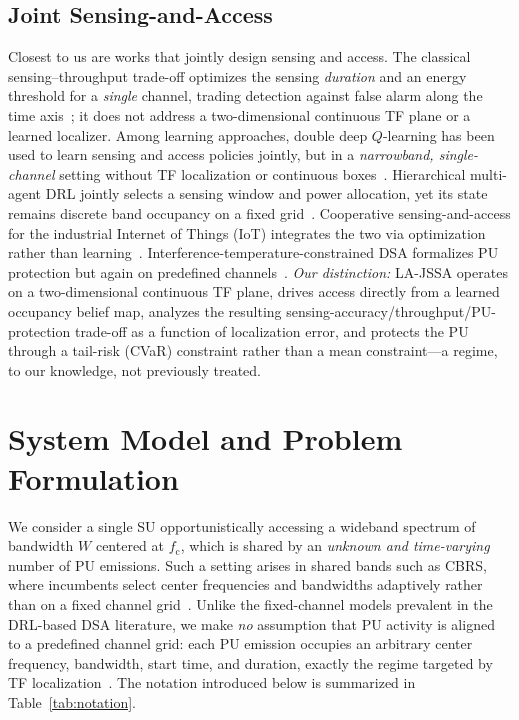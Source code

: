 \documentclass[journal]{IEEEtran}
\newcommand{\Wband}{W}                     %
\newcommand{\fc}{f_{\mathrm{c}}}           %
\begin{document}
\subsection{Joint Sensing-and-Access}
Closest to us are works that jointly design sensing and access. The classical
sensing--throughput trade-off optimizes the sensing \emph{duration} and an
energy threshold for a \emph{single} channel, trading detection against
false alarm along the time axis~\cite{liang2008sensing}; it does not address
a two-dimensional continuous TF plane or a learned localizer. Among learning
approaches, double deep $Q$-learning has been used to learn sensing and
access policies jointly, but in a \emph{narrowband, single-channel} setting
without TF localization or continuous boxes~\cite{bokobza2023ddqsa}.
Hierarchical multi-agent DRL jointly selects a sensing window and power
allocation, yet its state remains discrete band occupancy on a fixed
grid~\cite{li2024hmadrl}. Cooperative sensing-and-access for the industrial
Internet of Things (IoT) integrates the two via optimization rather than
learning~\cite{liu2023ciiot}.
Interference-temperature-constrained DSA formalizes PU protection but again
on predefined channels~\cite{xing2007dsa}. \emph{Our distinction:} LA-JSSA
operates on a two-dimensional continuous TF plane, drives access directly
from a learned occupancy belief map, analyzes the resulting
sensing-accuracy/throughput/PU-protection trade-off as a function of
localization error, and protects the PU through a tail-risk (CVaR) constraint
rather than a mean constraint---a regime, to our knowledge, not previously
treated.


\section{System Model and Problem Formulation}
\label{sec:system_model}

We consider a single SU opportunistically accessing a
wideband spectrum of bandwidth $\Wband$ centered at $\fc$, which is
shared by an \emph{unknown and time-varying} number of PU
emissions. Such a setting arises in shared bands such as CBRS, where
incumbents select center frequencies and bandwidths adaptively rather than on
a fixed channel grid~\cite{sohul2015cbrs,xing2007dsa}. Unlike the
fixed-channel models prevalent in the DRL-based DSA literature, we make
\emph{no} assumption that PU activity is aligned to a predefined channel
grid: each PU emission occupies an arbitrary center frequency, bandwidth,
start time, and duration, exactly the regime targeted by TF
localization~\cite{prasad2020,zhao2025trtfl_ssl}. The notation introduced
below is summarized in Table~\ref{tab:notation}.
\end{document}
